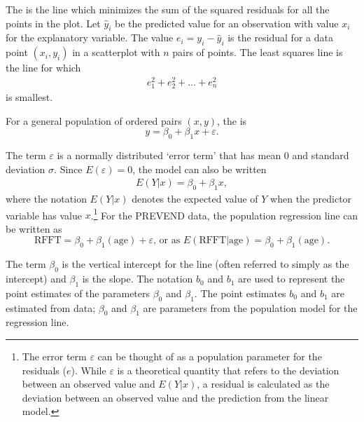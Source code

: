The  is the line which minimizes the sum of the squared residuals for all the points in the plot.  Let $\hat{y}_i$ be the predicted value for an observation with value $x_i$ for the explanatory variable.  The value $e_i = y_i - \hat{y}_i$ is the residual for a data point $(x_i, y_i)$ in a scatterplot with $n$ pairs of points.  The least squares line is the line for which
\begin{eqnarray}
e_{1}^2 + e_{2}^2 + \dots + e_{n}^2
\label{sumOfSquaresForResiduals}
\end{eqnarray}
is smallest. 

For a general population of ordered pairs $(x,y)$, the  is
\[y = \beta_0 + \beta_1x + \varepsilon.
\label{equation:generalRegressionModel}
\]

The term $\varepsilon$ is a normally distributed `error term' that has mean 0 and standard deviation $\sigma$. Since $E(\varepsilon) = 0$,  the model can also be written
\begin{align*}
	E(Y|x) = \beta_0 + \beta_1 x,
\end{align*}
where the notation $E(Y|x)$ denotes the expected value of $Y$ when the predictor variable has value $x$.\footnote{The error term $\varepsilon$ can be thought of as a population parameter for the residuals ($e$). While $\varepsilon$ is a theoretical quantity that refers to the deviation between an observed value and $E(Y|x)$, a residual is calculated as the deviation between an observed value and the prediction from the linear model.} For the PREVEND data, the population regression line can be written as
\[\text{RFFT} = \beta_0 + \beta_{1}(\text{age}) + \varepsilon, \, \text{or as }
 E (\text{RFFT}| \text{age}) = \beta_0 + \beta_{1}(\text{age}).\]

The term $\beta_0$ is the vertical intercept for the line (often referred to simply as the intercept) and $\beta_1$ is the slope. The notation $b_0$ and $b_1$ are used to represent the point estimates of the parameters $\beta_0$ and $\beta_1$. The point estimates $b_0$ and $b_1$ are estimated from data; $\beta_0$ and $\beta_1$ are parameters from the population model for the regression line.


